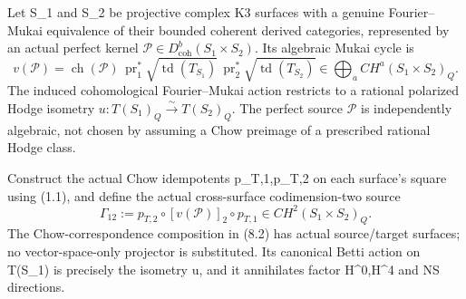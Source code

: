 \documentclass[11pt]{article}
\newcommand{\ch}{\operatorname{ch}}
\newcommand{\pr}{\operatorname{pr}}
\begin{document}
Let S_1 and S_2 be projective complex K3
surfaces with a genuine Fourier--Mukai
equivalence of their bounded coherent derived
categories, represented by an actual
perfect kernel
\(
 \mathcal P\in D^b_{\mathrm{coh}}(S_1\times S_2).
\)
Its algebraic Mukai cycle is
\[
 v(\mathcal P)
   =\ch(\mathcal P)\,
     \pr_1^*\sqrt{\operatorname{td}(T_{S_1})}\,
     \pr_2^*\sqrt{\operatorname{td}(T_{S_2})}
      \in\bigoplus_a CH^a(S_1\times S_2)_Q.
                                                               \tag{8.1}
\]
The induced cohomological Fourier--Mukai action
restricts to a rational polarized
Hodge isometry
\(
 u:T(S_1)_Q\xrightarrow{\sim}T(S_2)_Q
\).
The perfect source \(\mathcal P\)
is independently algebraic, not chosen
by assuming a Chow preimage of a
prescribed rational Hodge class.

Construct the actual Chow idempotents
p_{T,1},p_{T,2} on each surface's square
using (1.1), and define the actual
cross-surface codimension-two source
\[
 \boxed{
 \Gamma_{12}
    :=p_{T,2}\circ[v(\mathcal P)]_2
                     \circ p_{T,1}
       \in CH^2(S_1\times S_2)_Q.}                 \tag{8.2}
\]
The Chow-correspondence composition in
(8.2) has actual source/target surfaces;
no vector-space-only projector is substituted.
Its canonical Betti action on T(S_1)
is precisely the isometry u, and it
annihilates factor H^0,H^4 and NS
directions.
\end{document}
